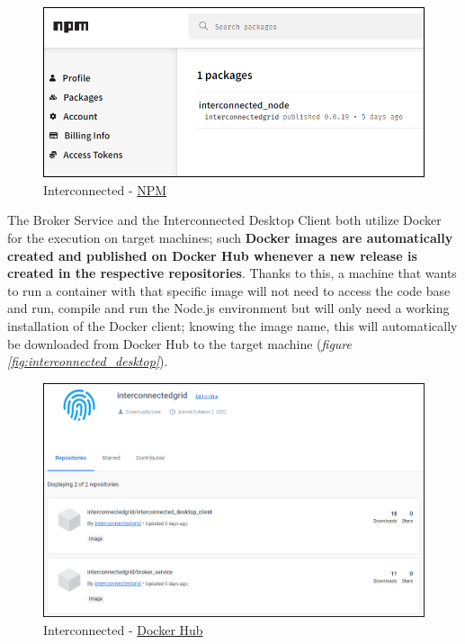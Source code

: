 \begin{figure}[!ht]
    \centering
    \includegraphics[scale=0.45]{document/chapters/chapter_7/images/interconnected_npm.png}
    \caption{Interconnected - \href{https://www.npmjs.com/package/interconnected_node}{NPM}}
    \label{fig:interconnected_npm}
\end{figure}

The Broker Service and the Interconnected Desktop Client both utilize Docker for the execution on target machines; such \textbf{Docker images are automatically created and published on Docker Hub whenever a new release is created in the respective repositories}. Thanks to this, a machine that wants to run a container with that specific image will not need to access the code base and run, compile and run the Node.js environment but will only need a working installation of the Docker client; knowing the image name, this will automatically be downloaded from Docker Hub to the target machine (\textit{figure \ref{fig:interconnected_desktop}}). 

\begin{figure}[!ht]
    \centering
    \includegraphics[width=\linewidth]{document/chapters/chapter_7/images/interconnected_dockerhub.png}
    \caption{Interconnected - \href{https://hub.docker.com/u/interconnectedgrid}{Docker Hub}}
    \label{fig:interconnected_dockerhub}
\end{figure}

